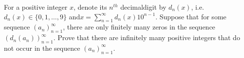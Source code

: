 \documentclass{article}
\begin{document}
\setlength{\parindent}{0pt}
For a positive integer $x$, denote its $n^{th}$ decimal\linebreak digit by $d_n(x)$, i.e. $d_n(x) \in \{0, 1, \ldots, 9\}$ and\linebreak ${x = \displaystyle\sum_{n=1}^{\infty}d_n(x)10^{n-1}}$. Suppose that for some sequence $\left(a_n\right)_{n=1}^{\infty}$, there are
only finitely many zeros in the sequence $\displaystyle\left(d_n\left(a_n\right)\right)_{n=1}^{\infty}$. Prove that there are infinitely many positive integers that do not occur in the sequence $\left(a_n\right)_{n=1}^{\infty}$.
\end{document}
